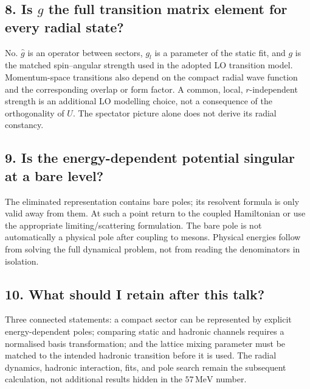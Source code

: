\documentclass[11pt,a4paper]{article}
\newcommand{\MeV}{\,\mathrm{MeV}}
\begin{document}
\subsection*{8. Is $g$ the full transition matrix element for every radial state?}
No. $\hat g$ is an operator between sectors, $g_l$ is a parameter of
the static fit, and $g$ is the matched spin--angular strength used in
the adopted LO transition model. Momentum-space transitions also depend
on the compact radial wave function and the corresponding overlap or
form factor. A common, local, $r$-independent strength is an additional
LO modelling choice, not a consequence of the orthogonality of $U$.
The spectator picture alone does not derive its radial constancy.

\subsection*{9. Is the energy-dependent potential singular at a bare level?}
The eliminated representation contains bare poles; its resolvent formula
is only valid away from them. At such a point return to the coupled
Hamiltonian or use the appropriate limiting/scattering formulation.
The bare pole is not automatically a physical pole after coupling to
mesons. Physical energies follow from solving the full dynamical problem,
not from reading the denominators in isolation.

\subsection*{10. What should I retain after this talk?}
Three connected statements: a compact sector can be represented by
explicit energy-dependent poles; comparing static and hadronic channels
requires a normalised basis transformation; and the lattice mixing
parameter must be matched to the intended hadronic transition before
it is used. The radial dynamics, hadronic interaction, fits, and pole
search remain the subsequent calculation, not additional results hidden
in the $57\MeV$ number.

\clearpage
{}
\end{document}
